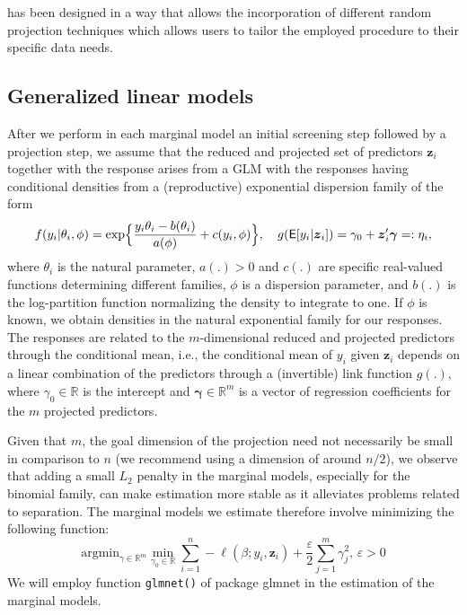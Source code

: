 \documentclass[
  article]{jss}
\begin{document}
 has been designed in a way that allows the incorporation of
different random projection techniques which allows users to tailor the
employed procedure to their specific data needs.

\subsection{Generalized linear models}\label{generalized-linear-models}

After we perform in each marginal model an initial screening step
followed by a projection step, we assume that the reduced and projected
set of predictors \(\boldsymbol{z}_i\) together with the response arises
from a GLM with the responses having conditional densities from a
(reproductive) exponential dispersion family of the form
\begin{align}\label{eqn:y_density}
  f(y_i|\theta_i,\phi) = \exp\Bigl\{\frac{y_i\theta_i- b(\theta_i)}{a(\phi)} + c(y_i,\phi)\Bigr\},
  \quad
    g(\mathsf{E}[y_i|\boldsymbol{z}_i]) = \gamma_0 + \boldsymbol{z}_i'\boldsymbol{\gamma}=:\eta_i,
\end{align} where \(\theta_i\) is the natural parameter, \(a(.)>0\) and
\(c(.)\) are specific real-valued functions determining different
families, \(\phi\) is a dispersion parameter, and \(b(.)\) is the
log-partition function normalizing the density to integrate to one. If
\(\phi\) is known, we obtain densities in the natural exponential family
for our responses. The responses are related to the \(m\)-dimensional
reduced and projected predictors through the conditional mean, i.e., the
conditional mean of \(y_i\) given \({\boldsymbol{z}}_i\) depends on a
linear combination of the predictors through a (invertible) link
function \(g(.)\), where \(\gamma_0\in\mathbb{R}\) is the intercept and
\(\boldsymbol{\gamma}\in\mathbb{R}^m\) is a vector of regression
coefficients for the \(m\) projected predictors.

Given that \(m\), the goal dimension of the projection need not
necessarily be small in comparison to \(n\) (we recommend using a
dimension of around \(n/2\)), we observe that adding a small \(L_2\)
penalty in the marginal models, especially for the binomial family, can
make estimation more stable as it alleviates problems related to
separation. The marginal models we estimate therefore involve minimizing
the following function: \[
 \text{argmin}_{{\gamma}\in\mathbb{R}^m}\min_{\gamma_0\in\mathbb{R}}  \sum_{i=1}^n -\ell(\beta;y_i,\boldsymbol{z}_i) + \frac{\varepsilon}{2}\sum_{j=1}^m{\gamma}_j^2, \, \varepsilon > 0
\] We will employ function \texttt{glmnet()} of package {glmnet}
\citep{glmnet2023} in the estimation of the marginal models.
\end{document}
